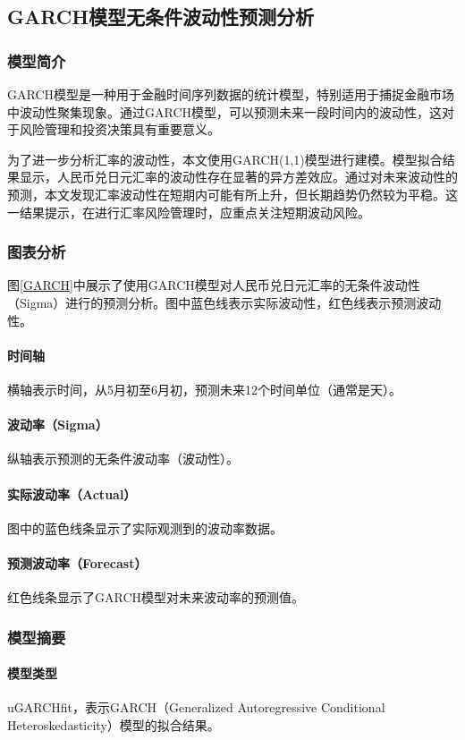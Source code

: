 \subsection{GARCH模型无条件波动性预测分析}
\subsubsection{模型简介}
GARCH模型是一种用于金融时间序列数据的统计模型，特别适用于捕捉金融市场中波动性聚集现象。通过GARCH模型，可以预测未来一段时间内的波动性，这对于风险管理和投资决策具有重要意义。

为了进一步分析汇率的波动性，本文使用GARCH(1,1)模型进行建模。模型拟合结果显示，人民币兑日元汇率的波动性存在显著的异方差效应。通过对未来波动性的预测，本文发现汇率波动性在短期内可能有所上升，但长期趋势仍然较为平稳。这一结果提示，在进行汇率风险管理时，应重点关注短期波动风险。

\subsubsection{图表分析}
图\ref{GARCH}中展示了使用GARCH模型对人民币兑日元汇率的无条件波动性（Sigma）进行的预测分析。图中蓝色线表示实际波动性，红色线表示预测波动性。
\paragraph{时间轴}横轴表示时间，从5月初至6月初，预测未来12个时间单位（通常是天）。
\paragraph{波动率（Sigma）}纵轴表示预测的无条件波动率（波动性）。
\paragraph{实际波动率（Actual）}图中的蓝色线条显示了实际观测到的波动率数据。
\paragraph{预测波动率（Forecast）}红色线条显示了GARCH模型对未来波动率的预测值。

\subsubsection{模型摘要}
\paragraph{模型类型}uGARCHfit，表示GARCH（Generalized Autoregressive Conditional Heteroskedasticity）模型的拟合结果。
